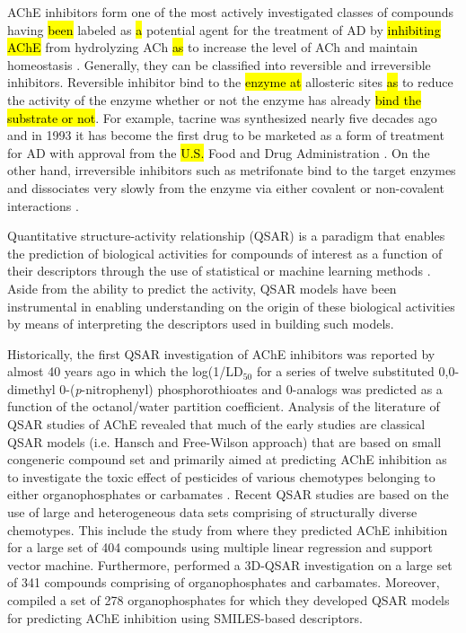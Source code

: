 \documentclass[fleqn,10pt]{wlpeerj}
\begin{document}
AChE inhibitors form one of the most actively investigated classes of compounds having \hl{been} labeled as \hl{a} potential agent for the treatment of AD by \hl{inhibiting AChE} from hydrolyzing ACh \hl{as} to increase the level of ACh and maintain homeostasis \citep{birks2006cholinesterase}. Generally, they can be classified into reversible and irreversible inhibitors. Reversible inhibitor bind to the \hl{enzyme at} allosteric sites \hl{as} to reduce the activity of the enzyme whether or not the enzyme has already \hl{bind the substrate or not}. For example, tacrine was synthesized nearly five decades ago and in 1993 it has become the first drug to be marketed as a form of treatment for AD with approval from the \hl{U.S.} Food and Drug Administration \citep{racchi2004acetylcholinesterase}. On the other hand, irreversible inhibitors such as metrifonate \citep{morris1998metrifonate} bind to the target enzymes and dissociates very slowly from the enzyme via either covalent or non-covalent interactions \citep{kitz1962esters}.

Quantitative structure-activity relationship (QSAR) is a paradigm that enables the prediction of biological activities for compounds of interest as a function of their descriptors through the use of statistical or machine learning methods \citep{nantasenamat2009practical}. Aside from the ability to predict the activity, QSAR models have been instrumental in enabling understanding on the origin of these biological activities by means of interpreting the descriptors used in building such models. 

Historically, the first QSAR investigation of AChE inhibitors was reported by \cite{Mundy1978quantitative} almost 40 years ago in which the log(1/LD$_{50}$ for a series of twelve substituted 0,0-dimethyl 0-(\textit{p}-nitrophenyl) phosphorothioates and 0-analogs was predicted as a function of the octanol/water partition coefficient. Analysis of the literature of QSAR studies of AChE revealed that much of the early studies are classical QSAR models (i.e. Hansch and Free-Wilson approach) that are based on small congeneric compound set and primarily aimed at predicting AChE inhibition as to investigate the toxic effect of pesticides of various chemotypes belonging to either organophosphates \citep{Mager1983QSAR, Aaviksaar1990QSAR} or carbamates \citep{Su1980QSAR, Goldblum1981Quantitative, Walters1986Case}. Recent QSAR studies are based on the use of large and heterogeneous data sets comprising of structurally diverse chemotypes. This include the study from \cite{yan2012quantitative} where they predicted AChE inhibition for a large set of 404 compounds using multiple linear regression and support vector machine. Furthermore, \cite{lee2016mechanism} performed a 3D-QSAR investigation on a large set of 341 compounds comprising of organophosphates and carbamates. Moreover, \cite{veselinovic2015monte} compiled a set of 278 organophosphates for which they developed QSAR models for predicting AChE inhibition using SMILES-based descriptors.
\end{document}
